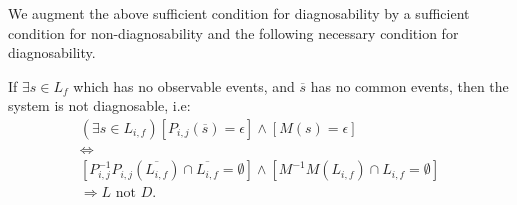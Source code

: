 \documentclass[a4paper,oneside]{article}
\begin{document}
% 


We augment the above sufficient condition for diagnosability by a sufficient
condition for non-diagnosability and the following necessary condition for
diagnosability.
 \begin{conjecture}
If $\exists s \in L_f$ which has no observable events, and $\overline{s}$ has no
common events, then the system is not diagnosable, i.e:
\begin{equation}
\begin{array}{l}
	(\exists s \in L_{i,f}) 
	\left[
		P_{i,j}(\overline{s}) = \epsilon
	\right]
		\land
	\left[
		M(s) = \epsilon
	\right]
	\\[1ex]
	\Leftrightarrow
	\\[1ex]
	\left[
		P^{-1}_{i,j}P_{i,j}(\overline{L_{i,f}})\cap \overline{L_{i,f}} = \emptyset
	\right]
		\land
	\left[
		M^{-1}M(L_{i,f})\cap L_{i,f} = \emptyset
	\right]
	\\[2ex]
	\Rightarrow L \textrm{ not }D.
\end{array}
\end{equation}
\end{conjecture}
\end{document}
